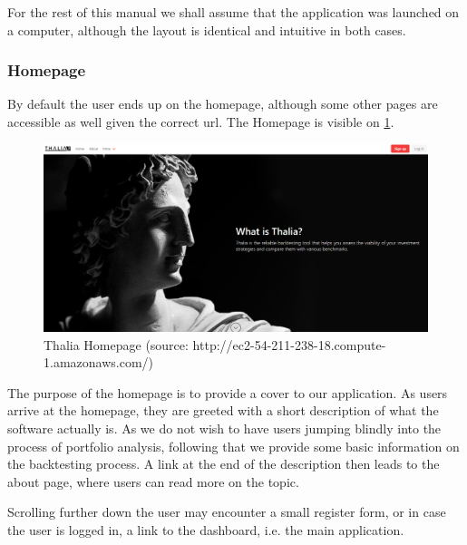 \documentclass[main.tex]{subfiles}
\begin{document}
For the rest of this manual we shall assume that the application was launched on a computer, although the layout is identical and intuitive in both cases. 

\subsubsection{Homepage}

By default the user ends up on the homepage, although some other pages are accessible as well given the correct url. The Homepage is visible on \figurename{\ref{thalia_home}}.

\begin{figure}[H]
   \centering
   \includegraphics[width=\textwidth]{10Appendices/081User/081Pictures/homepage.png}
   \caption{Thalia Homepage (source: http://ec2-54-211-238-18.compute-1.amazonaws.com/)}
   \label{thalia_home}
\end{figure}

The purpose of the homepage is to provide a cover to our application. As users arrive at the homepage, they are greeted with a short description of what the software actually is.
As we do not wish to have users jumping blindly into the process of portfolio analysis, following that we provide some basic information on the backtesting process. A link at the end of the description then leads to the about page, where users can read more on the topic.

Scrolling further down the user may encounter a small register form, or in case the user is logged in, a link to the dashboard, i.e. the main application.
\end{document}
